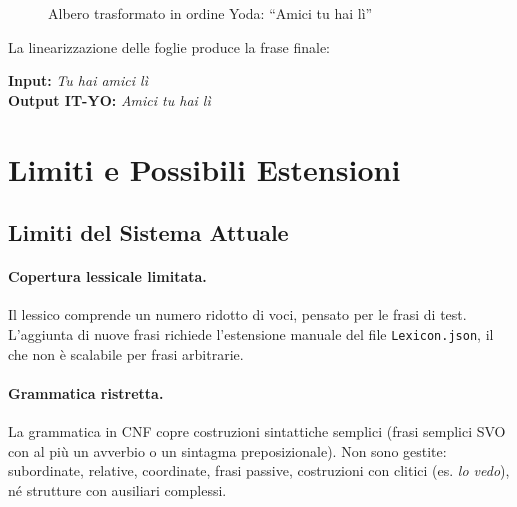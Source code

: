 \documentclass[12pt, a4paper]{article}
\begin{document}
\begin{figure}[H]
\centering
{}
\caption{Albero trasformato in ordine Yoda: ``Amici tu hai lì''}
\end{figure}

La linearizzazione delle foglie produce la frase finale:
\begin{center}
    \textbf{Input:} \textit{Tu hai amici lì} \\[0.3cm]
    \textbf{Output IT-YO:} \textit{Amici tu hai lì}
\end{center}

\section{Limiti e Possibili Estensioni}

\subsection{Limiti del Sistema Attuale}

\paragraph{Copertura lessicale limitata.}
Il lessico comprende un numero ridotto di voci, pensato per le frasi di test.
L'aggiunta di nuove frasi richiede l'estensione manuale del file \texttt{Lexicon.json},
il che non è scalabile per frasi arbitrarie.

\paragraph{Grammatica ristretta.}
La grammatica in CNF copre costruzioni sintattiche semplici (frasi semplici SVO
con al più un avverbio o un sintagma preposizionale). Non sono gestite:
subordinate, relative, coordinate, frasi passive, costruzioni con clitici (es.
\textit{lo vedo}), né strutture con ausiliari complessi.
\end{document}
